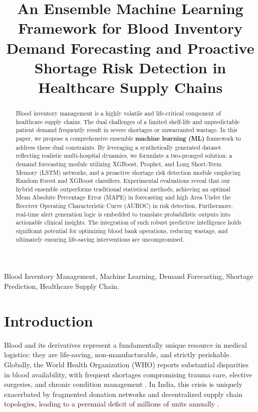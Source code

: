 \documentclass[conference]{IEEEtran}
\begin{document}
\title{An Ensemble Machine Learning Framework for Blood Inventory Demand Forecasting and Proactive Shortage Risk Detection in Healthcare Supply Chains}

\author{
}

\maketitle

\begin{abstract}
Blood inventory management is a highly volatile and life-critical component of healthcare supply chains. The dual challenges of a limited shelf-life and unpredictable patient demand frequently result in severe shortages or unwarranted wastage. In this paper, we propose a comprehensive ensemble \textbf{machine learning (ML)} framework to address these dual constraints. By leveraging a synthetically generated dataset reflecting realistic multi-hospital dynamics, we formulate a two-pronged solution: a demand forecasting module utilizing XGBoost, Prophet, and Long Short-Term Memory (LSTM) networks, and a proactive shortage risk detection module employing Random Forest and XGBoost classifiers. Experimental evaluations reveal that our hybrid ensemble outperforms traditional statistical methods, achieving an optimal Mean Absolute Percentage Error (MAPE) in forecasting and high Area Under the Receiver Operating Characteristic Curve (AUROC) in risk detection. Furthermore, real-time alert generation logic is embedded to translate probabilistic outputs into actionable clinical insights. The integration of such robust predictive intelligence holds significant potential for optimizing blood bank operations, reducing wastage, and ultimately ensuring life-saving interventions are uncompromised.
\end{abstract}

\begin{IEEEkeywords}
Blood Inventory Management, Machine Learning, Demand Forecasting, Shortage Prediction, Healthcare Supply Chain.
\end{IEEEkeywords}

\section{Introduction}
Blood and its derivatives represent a fundamentally unique resource in medical logistics: they are life-saving, non-manufacturable, and strictly perishable. Globally, the World Health Organization (WHO) reports substantial disparities in blood availability, with frequent shortages compromising trauma care, elective surgeries, and chronic condition management \cite{b1}. In India, this crisis is uniquely exacerbated by fragmented donation networks and decentralized supply chain topologies, leading to a perennial deficit of millions of units annually \cite{b2}.
\end{document}
